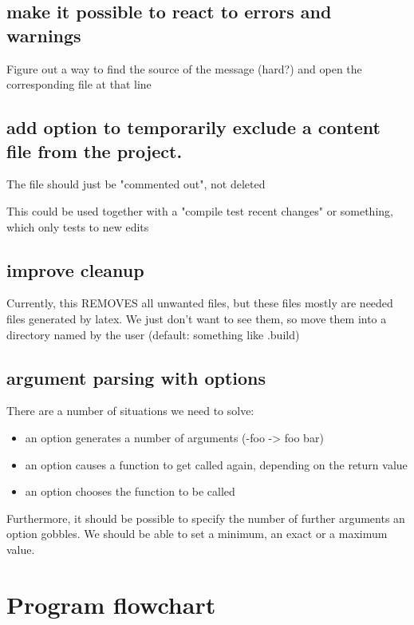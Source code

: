 \documentclass[parskip=half]{scrartcl}
\begin{document}
    \subsection{make it possible to react to errors and warnings}
    Figure out a way to find the source of the message (hard?) and open the corresponding file at that line

    \subsection{add option to temporarily exclude a content file from the project. }
    The file should just be "commented out", not deleted

    This could be used together with a "compile test recent changes" or something, which only tests to new edits

    \subsection{improve cleanup }
    Currently, this REMOVES all unwanted files, but these files mostly are needed files generated by latex. We just don't want to see them, so move them into
    a directory named by the user (default: something like .build)

    \subsection{argument parsing with options}
    There are a number of situations we need to solve:
    \begin{itemize}
      \item an option generates a number of arguments (-foo -> foo bar)
      \item an option causes a function to get called again, depending on the return value
      \item an option chooses the function to be called
    \end{itemize}
    Furthermore, it should be possible to specify the number of further arguments an option gobbles. We should be able to set a minimum, an exact or a maximum
    value.
\section{Program flowchart}
  \begin{center}
  \end{center}
\end{document}
